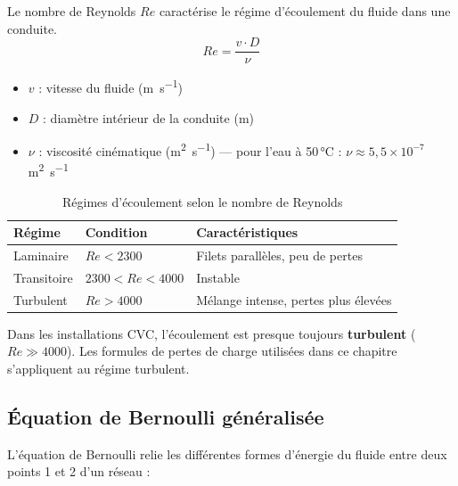 \begin{definition}[title=Nombre de Reynolds]
Le nombre de Reynolds $Re$ caractérise le régime d'écoulement du fluide dans une conduite.
\begin{equation}
  Re = \frac{v \cdot D}{\nu}
\end{equation}
\begin{itemize}
  \item $v$ : vitesse du fluide (\si{\metre\per\second})
  \item $D$ : diamètre intérieur de la conduite (\si{\metre})
  \item $\nu$ : viscosité cinématique (\si{\square\metre\per\second}) — pour l'eau à 50\,°C : $\nu \approx 5{,}5 \times 10^{-7}$\,\si{\square\metre\per\second}
\end{itemize}
\end{definition}

\begin{table}[H]
  \centering
  \caption{Régimes d'écoulement selon le nombre de Reynolds}
  \begin{tabular}{lll}
    \toprule
    Régime & Condition & Caractéristiques \\
    \midrule
    Laminaire & $Re < 2300$ & Filets parallèles, peu de pertes \\
    Transitoire & $2300 < Re < 4000$ & Instable \\
    Turbulent & $Re > 4000$ & Mélange intense, pertes plus élevées \\
    \bottomrule
  \end{tabular}
\end{table}

\begin{attention}
Dans les installations CVC, l'écoulement est presque toujours \textbf{turbulent} ($Re \gg 4000$). Les formules de pertes de charge utilisées dans ce chapitre s'appliquent au régime turbulent.
\end{attention}

\subsection{Équation de Bernoulli généralisée}

L'équation de Bernoulli relie les différentes formes d'énergie du fluide entre deux points 1 et 2 d'un réseau :

